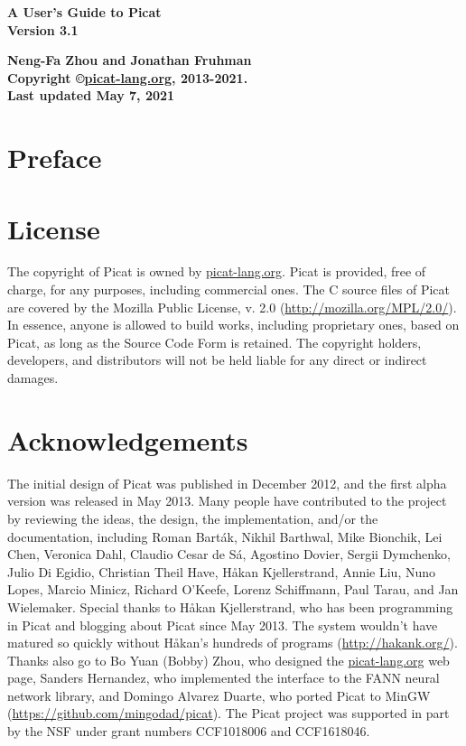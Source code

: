 \documentclass[11pt]{report}
\begin{document}
\vspace*{4cm}
\begin{center}
{\Huge\bf A User's Guide to Picat} \\
{\large\bf Version 3.1} \\


\vspace*{1cm}

{\large\bf Neng-Fa Zhou and Jonathan Fruhman} \\
\vspace*{1cm}
{\bf Copyright \copyright \url{picat-lang.org}, 2013-2021.} \\
{\bf Last updated May 7, 2021} \\
\end{center}
\thispagestyle{empty}
\clearpage

\pagestyle{plain}

\section*{Preface}


\clearpage
\section*{License}
The copyright of Picat is owned by \url{picat-lang.org}. Picat is provided, free of charge, for any purposes, including commercial ones. The C source files of Picat are covered by the Mozilla Public License, v. 2.0 (\url{http://mozilla.org/MPL/2.0/}). In essence, anyone is allowed to build works, including proprietary ones, based on Picat, as long as the Source Code Form is retained. The copyright holders, developers, and distributors will not be held liable for any direct or indirect damages.

 
\section*{Acknowledgements}
The initial design of Picat was published in December 2012, and the first alpha version was released in May 2013.  Many people have contributed to the project by reviewing the ideas, the design, the implementation, and/or the documentation, including Roman Bart\'{a}k, Nikhil Barthwal, Mike Bionchik, Lei Chen, Veronica Dahl, Claudio Cesar de S\'{a}, Agostino Dovier, Sergii Dymchenko, Julio Di Egidio, Christian Theil Have, H{\aa}kan Kjellerstrand,  Annie Liu, Nuno Lopes, Marcio Minicz, Richard O'Keefe, Lorenz Schiffmann, Paul Tarau, and Jan Wielemaker.  Special thanks to H{\aa}kan Kjellerstrand, who has been programming in Picat and blogging about Picat since May 2013. The system wouldn't have matured so quickly without H{\aa}kan's hundreds of programs (\url{http://hakank.org/}). Thanks also go to Bo Yuan (Bobby) Zhou, who designed the \url{picat-lang.org} web page, Sanders Hernandez, who implemented the interface to the FANN neural network library, and Domingo Alvarez Duarte, who ported Picat to MinGW (\url{https://github.com/mingodad/picat}). The Picat project was supported in part by the NSF under grant numbers CCF1018006 and CCF1618046.
\end{document}
